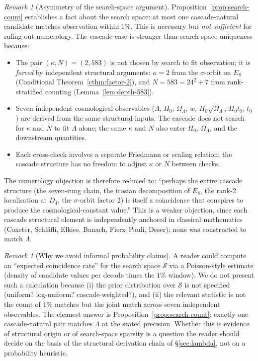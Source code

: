 \documentclass[11pt]{article}
\theoremstyle{plain}
\theoremstyle{definition}
\theoremstyle{remark}
\newtheorem{remark}[theorem]{Remark}
\begin{document}
\begin{remark}[Asymmetry of the search-space argument]
Proposition~\ref{prop:search-count} establishes a fact about the search space: at most one cascade-natural candidate matches observation within $1\%$. This is necessary but \emph{not sufficient} for ruling out numerology. The cascade case is stronger than search-space uniqueness because:
\begin{itemize}[leftmargin=2em]
\item The pair $(\kappa, N) = (2, 583)$ is not chosen by search to fit observation; it is \emph{forced} by independent structural arguments: $\kappa = 2$ from the $\sigma$-orbit on $E_8$ (Conditional Theorem~\ref{cthm:factor-2}), and $N = 583 = 24^2 + 7$ from rank-stratified counting (Lemma~\ref{lem:depth-583}).
\item Seven independent cosmological observables ($\Lambda$, $H_0$, $\Omega_\Lambda$, $w$, $H_0\sqrt{\Omega_\Lambda}$, $H_0 t_0$, $t_0$) are derived from the same structural inputs. The cascade does not search for $\kappa$ and $N$ to fit $\Lambda$ alone; the same $\kappa$ and $N$ also enter $H_0$, $\Omega_\Lambda$, and the downstream quantities.
\item Each cross-check involves a separate Friedmann or scaling relation; the cascade structure has no freedom to adjust $\kappa$ or $N$ between checks.
\end{itemize}
The numerology objection is therefore reduced to: ``perhaps the entire cascade structure (the seven-rung chain, the icosian decomposition of $E_8$, the rank-2 localisation at $D_4$, the $\sigma$-orbit factor 2) is itself a coincidence that conspires to produce the cosmological-constant value.'' This is a weaker objection, since each cascade structural element is independently anchored in classical mathematics (Coxeter, Schl\"afli, Elkies, Banach, Fierz--Pauli, Deser); none was constructed to match $\Lambda$.
\end{remark}

\begin{remark}[Why we avoid informal probability claims]
A reader could compute an ``expected coincidence rate'' for the search space $\mathcal{S}$ via a Poisson-style estimate (density of candidate values per decade times the $1\%$ window). We do not present such a calculation because (i) the prior distribution over $\mathcal{S}$ is not specified (uniform? log-uniform? cascade-weighted?), and (ii) the relevant statistic is not the count of $1\%$ matches but the joint match across seven independent observables. The cleanest answer is Proposition~\ref{prop:search-count}: exactly one cascade-natural pair matches $\Lambda$ at the stated precision. Whether this is evidence of structural origin or of search-space sparsity is a question the reader should decide on the basis of the structural derivation chain of \S\ref{sec:lambda}, not on a probability heuristic.
\end{remark}
\end{document}
